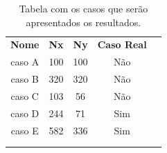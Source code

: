 \begin{table}[]
    \caption{Tabela com os casos que serão apresentados os resultados. }\label{tab:descricaoModelos}
    \centering
    \begin{tabular}{ccccl}
    \cline{1-4}
    \multicolumn{1}{|c|}{\textbf{Nome}} & \multicolumn{1}{c|}{\textbf{Nx}} & \multicolumn{1}{c|}{\textbf{Ny}} & \multicolumn{1}{c|}{\textbf{Caso Real}} &  \\ \cline{1-4}
    \multicolumn{1}{|c|}{caso A}        & \multicolumn{1}{c|}{100}         & \multicolumn{1}{c|}{100}         & \multicolumn{1}{c|}{Não}                   &  \\ \cline{1-4}
    \multicolumn{1}{|c|}{caso B}        & \multicolumn{1}{c|}{320}         & \multicolumn{1}{c|}{320}         & \multicolumn{1}{c|}{Não}                   &  \\ \cline{1-4}
    \multicolumn{1}{|c|}{caso C}        & \multicolumn{1}{c|}{103}         & \multicolumn{1}{c|}{56}          & \multicolumn{1}{c|}{Não}                   &  \\ \cline{1-4}
    \multicolumn{1}{|c|}{caso D}        & \multicolumn{1}{c|}{244}         & \multicolumn{1}{c|}{71}          & \multicolumn{1}{c|}{Sim}                &  \\ \cline{1-4}
    \multicolumn{1}{|c|}{caso E}        & \multicolumn{1}{c|}{582}         & \multicolumn{1}{c|}{336}         & \multicolumn{1}{c|}{Sim}                &  \\ \cline{1-4}
    \multicolumn{1}{l}{}                & \multicolumn{1}{l}{}             & \multicolumn{1}{l}{}             & \multicolumn{1}{l}{}                    &  \\
    \multicolumn{1}{l}{}                & \multicolumn{1}{l}{}             & \multicolumn{1}{l}{}             & \multicolumn{1}{l}{}                    & 
    \end{tabular}
\end{table}



    

